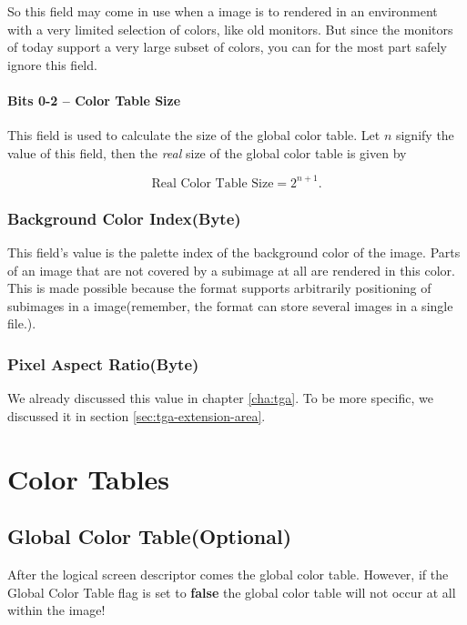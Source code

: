 So this field may come in use when a \gif image is to rendered in an
environment with a very limited selection of colors, like old
monitors.  But since the monitors of today support a very large subset
of colors, you can for the most part safely ignore this field.

\paragraph{Bits 0-2 -- Color Table Size}

This field is used to calculate the size of the global color table.
Let $n$ signify the value of this field, then the \textit{real} size
of the global color table is given by

\begin{equation}
  \label{eq:calc-global-color-table-size}
  \text{Real Color Table Size} = 2^{n + 1}.
\end{equation}

\subsubsection{Background Color Index(Byte)}

This field's value is the palette index of the background color of the
image. Parts of an image that are not covered by a subimage at all are
rendered in this color. This is made possible because the \gif format
supports arbitrarily positioning of subimages in a \gif image(remember,
the \gif format can store several images in a single file.).

\subsubsection{Pixel Aspect Ratio(Byte)}

We already discussed this value in chapter \ref{cha:tga}. To be more
specific, we discussed it in section \ref{sec:tga-extension-area}.

\section{Color Tables}

\subsection{Global Color Table(Optional)}

After the logical screen descriptor comes the global color
table. However, if the Global Color Table flag is set to
\textbf{false} the global color table will not occur at all within
the image!

